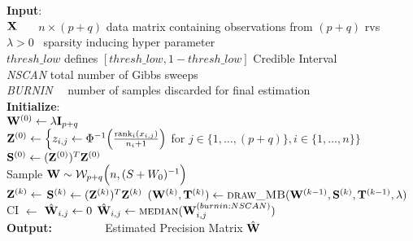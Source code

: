 \begin{algorithm}[H]
{\begin{algorithmic}
				\State
				\EndFunction
				\\
				\hrulefill
		\\
		\State \textbf{Input}: \\
		\quad\quad\quad\quad\quad
		$\mathbf{X}$ \qquad \quad\quad \ \ \  $n \times (p+q)$ data matrix containing observations from $(p+q)$ rvs
		\\
		\quad\quad\quad\quad\quad
		$\lambda>0$ \qquad \quad \ sparsity inducing hyper parameter
		\\
		\quad\quad\quad\quad\quad
		$thresh\_low$ \quad defines $[thresh\_low, 1-thresh\_low]$ Credible Interval
		\\
		\quad\quad\quad\quad\quad
		\textit{NSCAN} \qquad total number of Gibbs sweeps
		\\
		\quad\quad\quad\quad\quad
		\textit{BURNIN} \quad \ \ number of samples discarded for final estimation
		\\
		\State \textbf{Initialize}:\\
		\quad\quad\quad\quad\quad
		$\mathbf{W}^{(0)} \gets \lambda \mathbf{I}_{p+q}$
		\\
		\quad\quad\quad\quad\quad
		$\mathbf{Z}^{(0)} \gets 
		\Big\{
		{z}_{i,j} \gets \Phi^{-1}
		\Big(\frac{\text{rank}_i(x_{i,j})}{n_i+1} \Big)$ for $j\in \{1,\dots,(p+q)\}, i \in \{1,\dots,n\}
		\Big\}$
		\\
		\quad\quad\quad\quad\quad
		$\mathbf{S}^{(0)} \gets (\mathbf{Z}^{(0)})^T \mathbf{Z}^{(0)} $
		\\
		\quad\quad\quad\quad\quad
		Sample $\mathbf{W} \sim \mathcal{W}_{p+q}\Big(n, (S+W_0)^{-1}\Big) $
		\\
		\State
		$\mathbf{Z}^{(k)} \gets$ 
		\State
		$ \mathbf{S}^{(k)} \gets (\mathbf{Z}^{(k)})^T\mathbf{Z}^{(k)} $
		\State $(\W^{(k)}, \matr{T}^{(k)}) \gets \Call{draw\_MB}{\W^{(k-1)}, \matr{S}^{(k)}, \matr{T}^{(k-1)}, \lambda}$
		\EndFor
		\State
			\State
			CI $\gets$ 
				\State
				$\hat{\mathbf{W}}_{i,j} \gets 0$
				\Else
				\State
				$\hat{\W}_{i,j} \gets \Call{median}{\W_{i,j}^{(burnin:NSCAN)}}$
				\EndIf
		\EndFor
		\\
		\State
		\textbf{Output:}
		\State $\qquad\qquad $ Estimated Precision Matrix $\hat{\mathbf{W}}$
	\end{algorithmic}}
\end{algorithm}

